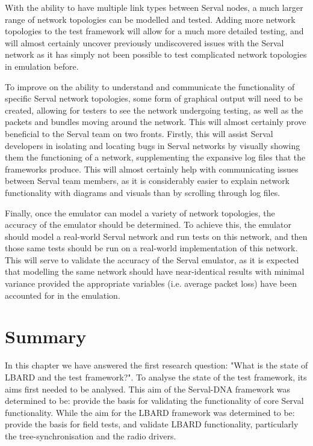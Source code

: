 With the ability to have multiple link types between Serval nodes, a much larger range of network topologies can be modelled and tested.
Adding more network topologies to the test framework will allow for a much more detailed testing, and will almost certainly uncover previously undiscovered issues with the Serval network as it has simply not been possible to test complicated network topologies in emulation before.

To improve on the ability to understand and communicate the functionality of specific Serval network topologies, some form of graphical output will need to be created, allowing for testers to see the network undergoing testing, as well as the packets and bundles moving around the network.
This will almost certainly prove beneficial to the Serval team on two fronts. 
Firstly, this will assist Serval developers in isolating and locating bugs in Serval networks by visually showing them the functioning of a network, supplementing the expansive log files that the frameworks produce.
This will almost certainly help with communicating issues between Serval team members, as it is considerably easier to explain network functionality with diagrams and visuals than by scrolling through log files.

Finally, once the emulator can model a variety of network topologies, the accuracy of the emulator should be determined.
To achieve this, the emulator should model a real-world Serval network and run tests on this network, and then those same tests should be run on a real-world implementation of this network.
This will serve to validate the accuracy of the Serval emulator, as it is expected that modelling the same network should have near-identical results with minimal variance provided the appropriate variables (i.e. average packet loss) have been accounted for in the emulation.

\section{Summary}

In this chapter we have answered the first research question: "What is the state of LBARD and the test framework?".
To analyse the state of the test framework, its aims first needed to be analysed. 
This aim of the Serval-DNA framework was determined to be: provide the basis for validating the functionality of core Serval functionality.
While the aim for the LBARD framework was determined to be: provide the basis for field tests, and validate LBARD functionality, particularly the tree-synchronisation and the radio drivers.

